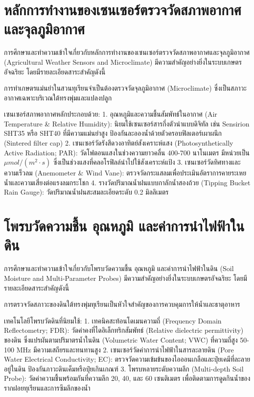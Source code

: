 
\section{หลักการทำงานของเซนเซอร์ตรวจวัดสภาพอากาศและจุลภูมิอากาศ}

การศึกษาและทำความเข้าใจเกี่ยวกับหลักการทำงานของเซนเซอร์ตรวจวัดสภาพอากาศและจุลภูมิอากาศ (Agricultural Weather Sensors and Microclimate) มีความสำคัญอย่างยิ่งในระบบเกษตรอัจฉริยะ โดยมีรายละเอียดสาระสำคัญดังนี้

การทำเกษตรแม่นยำในสวนทุเรียนจำเป็นต้องตรวจวัดจุลภูมิอากาศ (Microclimate) ซึ่งเป็นสภาวะอากาศเฉพาะบริเวณใต้ทรงพุ่มและแปลงปลูก

เซนเซอร์สภาพอากาศหลักประกอบด้วย:
1. อุณหภูมิและความชื้นสัมพัทธ์ในอากาศ (Air Temperature \& Relative Humidity): นิยมใช้เซนเซอร์สารกึ่งตัวนำแบบดิจิทัล เช่น Sensirion SHT35 หรือ SHT40 ที่มีความแม่นยำสูง ป้องกันละอองน้ำด้วยตัวครอบฟิลเตอร์เผาผนึก (Sintered filter cap)
2. เซนเซอร์วัดรังสีดวงอาทิตย์สังเคราะห์แสง (Photosynthetically Active Radiation; PAR): วัดโฟตอนแสงในช่วงความยาวคลื่น 400-700 นาโนเมตร มีหน่วยเป็น $\mu mol/(m^2\cdot s)$ ซึ่งเป็นช่วงแสงที่คลอโรฟิลล์นำไปใช้สังเคราะห์แป้ง
3. เซนเซอร์วัดทิศทางและความเร็วลม (Anemometer \& Wind Vane): ตรวจวัดกระแสลมเพื่อประเมินอัตราการคายระเหยน้ำและความเสี่ยงต่อแรงลมกระโชก
4. รางวัดปริมาณน้ำฝนแบบกาลักน้ำสองถ้วย (Tipping Bucket Rain Gauge): วัดปริมาณน้ำฝนสะสมละเอียดระดับ 0.2 มิลลิเมตร

\section{โพรบวัดความชื้น อุณหภูมิ และค่าการนำไฟฟ้าในดิน}

การศึกษาและทำความเข้าใจเกี่ยวกับโพรบวัดความชื้น อุณหภูมิ และค่าการนำไฟฟ้าในดิน (Soil Moisture and Multi-Parameter Probes) มีความสำคัญอย่างยิ่งในระบบเกษตรอัจฉริยะ โดยมีรายละเอียดสาระสำคัญดังนี้

การตรวจวัดสภาวะของดินใต้ทรงพุ่มทุเรียนเป็นหัวใจสำคัญของการควบคุมการให้น้ำและธาตุอาหาร

เทคโนโลยีโพรบวัดดินที่นิยมใช้:
1. เทคนิคสะท้อนโดเมนความถี่ (Frequency Domain Reflectometry; FDR): วัดค่าคงที่ไดอิเล็กทริกสัมพัทธ์ (Relative dielectric permittivity) ของดิน ซึ่งแปรผันตามปริมาตรน้ำในดิน (Volumetric Water Content; VWC) ที่ความถี่สูง 50-100 MHz มีความเสถียรและทนทานสูง
2. เซนเซอร์วัดค่าการนำไฟฟ้าในสารละลายดิน (Pore Water Electrical Conductivity; EC): ตรวจวัดความเข้มข้นของไอออนเกลือและปุ๋ยเคมีที่ละลายอยู่ในดิน ป้องกันภาวะดินเค็มหรือปุ๋ยเกินเกณฑ์
3. โพรบหลายระดับความลึก (Multi-depth Soil Probe): วัดค่าความชื้นพร้อมกันที่ความลึก 20, 40, และ 60 เซนติเมตร เพื่อติดตามการดูดกินน้ำของรากฝอยทุเรียนและการซึมลึกของน้ำ


